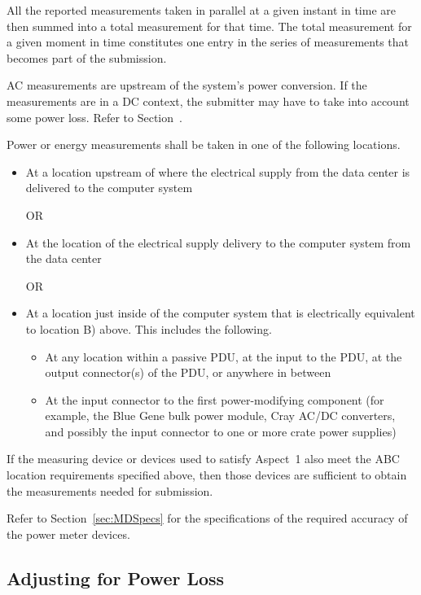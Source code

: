 All the reported measurements taken in parallel at a given instant in time are then summed into a total measurement for that time.
The total measurement for a given moment in time constitutes one entry in the series of measurements that becomes part of the submission.

AC measurements are upstream of the system's power conversion.
If the measurements are in a DC context, the submitter may have to take into account some power loss.
Refer to Section~.

Power or energy measurements shall be taken in one of the following locations.

\begin{itemize}
\item[{A)}]
At a location upstream of where the electrical supply from the data center is delivered to the computer system

OR

\item[{B)}]
At the location of the electrical supply delivery to the computer system from the data center

OR

\item[{C)}]
At a location just inside of the computer system that is electrically equivalent to location B) above.
This includes the following.

\begin{itemize}
\item
At any location within a passive PDU, at the input to the PDU, at the output connector(s) of the PDU, or anywhere in between 
\item
At the input connector to the first power-modifying component (for example, the Blue Gene bulk power module, Cray AC/DC converters, and possibly the input connector to one or more crate power supplies)
\end{itemize}
\end{itemize}

If the measuring device or devices used to satisfy Aspect~1 also meet the ABC location requirements specified above, then those devices are sufficient to obtain the measurements needed for submission.

Refer to Section~\ref{sec:MDSpecs} for the specifications of the required accuracy of the power meter devices.

\subsection{Adjusting for Power Loss}
\label{sec:AfPL}

